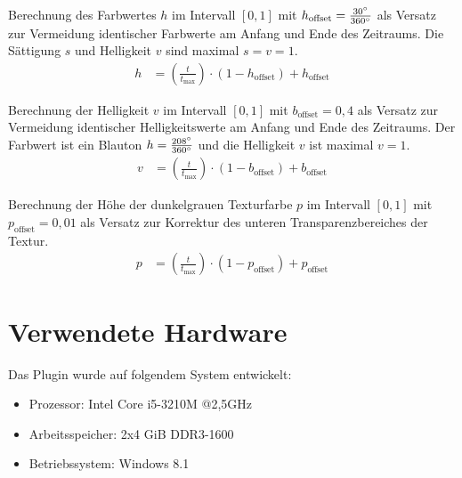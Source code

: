 Berechnung des Farbwertes $h$ im Intervall $[0,1]$ mit $h_{\text{offset}} = \frac{30\degree}{360\degree}$ als Versatz zur Vermeidung identischer Farbwerte am Anfang und Ende des Zeitraums. Die Sättigung $s$ und Helligkeit $v$ sind maximal $s = v = 1$.
\begin{equation}
\begin{aligned}\label{eq:berechnungen:glyph-farbe}
h &= \left(\frac{t}{t_{\text{max}}}\right) \cdot (1 - h_{\text{offset}}) + h_{\text{offset}}
\end{aligned}
\end{equation}

Berechnung der Helligkeit $v$ im Intervall $[0,1]$ mit $b_{\text{offset}} = 0,4$ als Versatz zur Vermeidung identischer Helligkeitswerte am Anfang und Ende des Zeitraums. Der Farbwert ist ein Blauton $h = \frac{208\degree}{360\degree}$ und die Helligkeit $v$ ist maximal $v = 1$.
\begin{equation}
\begin{aligned}\label{eq:berechnungen:glyph-helligkeit}
v &= \left(\frac{t}{t_{\text{max}}}\right) \cdot (1 - b_{\text{offset}}) + b_{\text{offset}}
\end{aligned}
\end{equation}

Berechnung der Höhe der dunkelgrauen Texturfarbe $p$ im Intervall $[0,1]$ mit $p_{\text{offset}} = 0,01$ als Versatz zur Korrektur des unteren Transparenzbereiches der Textur. %
\begin{equation}
\begin{aligned}\label{eq:berechnungen:glyph-textur}
p &= \left(\frac{t}{t_{\text{max}}}\right) \cdot (1 - p_{\text{offset}}) + p_{\text{offset}}
\end{aligned}
\end{equation}

\section{Verwendete Hardware}\label{sec:hardware}
Das Plugin wurde auf folgendem System entwickelt:
\begin{itemize}
	\item Prozessor: Intel Core i5-3210M @2,5GHz
	\item Arbeitsspeicher: 2x4 \gls{GiB} DDR3-1600
	\item Betriebssystem: Windows 8.1
\end{itemize}

